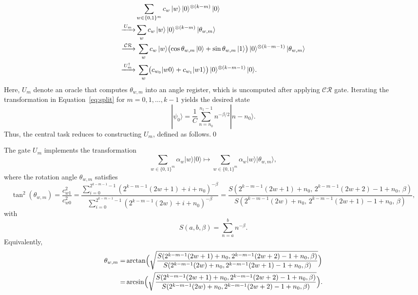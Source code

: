 \documentclass[aps,pra,twocolumn,superscriptaddress,preprintnumbers,amsmath,amssymb]{revtex4-2}
\begin{document}
\begin{align}\label{eq:split}
    &\sum_{w\in\{0,1\}^m} c_w\,|w\rangle\,|0\rangle^{\otimes (k-m)}\,|0\rangle\notag\\
    \xrightarrow{\,U_m\,}&
    \sum_{w} c_w\,|w\rangle\,|0\rangle^{\otimes (k-m)}\,|\theta_{w,m}\rangle \notag\\
    \xrightarrow{\,\mathcal{CR}\,}&\;
    \sum_{w} c_w\,|w\rangle\bigl(\cos\theta_{w,m}\,|0\rangle+\sin\theta_{w,m}\,|1\rangle\bigr)\,|0\rangle^{\otimes (k-m-1)}\,|\theta_{w,m}\rangle \notag\\
    \xrightarrow{\,U_m^{\dagger}\,}&\;
    \sum_{w}\bigl(c_{w_0}|w0\rangle+c_{w_1}|w1\rangle\bigr)\,|0\rangle^{\otimes (k-m-1)}\,|0\rangle.
\end{align}
Here, $U_m$ denote an oracle that computes $\theta_{w,m}$ into an angle register,
which is uncomputed after applying \(\mathcal{CR}\) gate.  Iterating the transformation in Equation~\eqref{eq:split} for $m=0,1,\dots,k-1$ yields the desired state 
\begin{equation}
    |\psi_0\rangle=\frac{1}{C}\sum_{n=n_0}^{n_1-1} n^{-\beta/2}|n-n_0\rangle.
\end{equation}
Thus, the central task reduces to constructing $U_m$,  defined as follows.\qed
\begin{definition}\label{def:Um}
The gate \(U_m\) implements the transformation
\begin{equation}
\sum_{w\in \{0,1\}^m}\alpha_w|w\rangle|0\rangle\mapsto\sum_{w\in \{0,1\}^m}\alpha_w|w\rangle|\theta_{w,m}\rangle,
\end{equation}
where the rotation angle \(\theta_{w,m}\) satisfies
\begin{equation}
\tan^2(\theta_{w,m})=\frac{c^2_{w1}}{c^2_{w0}}
=\frac{\sum\limits_{i=0}^{2^{k-m-1}-1}(2^{k-m-1}(2w+1)+i+n_0)^{-\beta}}
{\sum\limits_{i=0}^{2^{k-m-1}-1}(2^{k-m-1}(2w)+i+n_0)^{-\beta}}
=\frac{S(2^{k-m-1}(2w+1)+n_0,\,2^{k-m-1}(2w+2)-1+n_0,\,\beta)}
{S(2^{k-m-1}(2w)+n_0,\,2^{k-m-1}(2w+1)-1+n_0,\,\beta)},
\end{equation}
with
\begin{equation}
S(a,b,\beta)=\sum_{n=a}^b n^{-\beta}.
\end{equation}
Equivalently, 
\begin{align}\label{eq:theta}
    \theta_{w,m}=&\arctan\Bigl(\sqrt{\frac{S(2^{k-m-1}(2w+1)+n_0,2^{k-m-1}(2w+2)-1+n_0,\beta)}{S(2^{k-m-1} (2w)+n_0,2^{k-m-1}(2w+1)-1+n_0,\beta)}}\Bigr)\notag\\
    =  &\arcsin\Bigl(\sqrt{\frac{S(2^{k-m-1}(2w+1)+n_0,2^{k-m-1}(2w+2)-1+n_0,\beta)}{S(2^{k-m-1}(2w)+n_0,2^{k-m-1}(2w+2)-1+n_0,\beta)}}\Bigr).
\end{align}
\end{definition}
\end{document}
